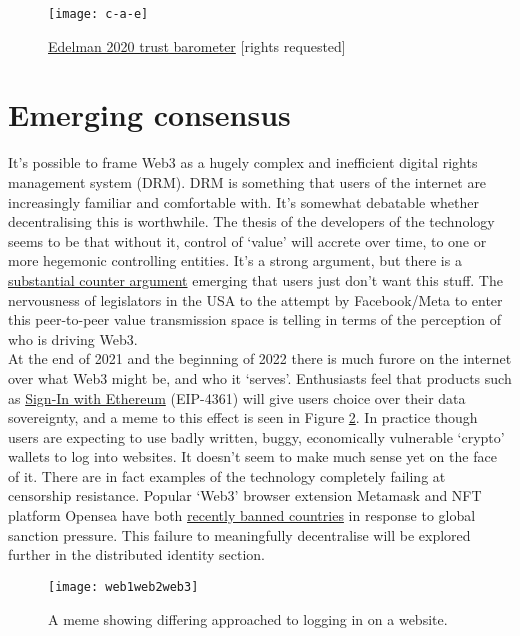 \begin{figure}
  \centering
    \texttt{[image: c-a-e]}
  \caption{\href{https://www.edelman.com/trust/2020-trust-barometer}{Edelman 2020 trust barometer} [rights requested]}
  \label{fig:trustbarometer}
\end{figure}
\section{Emerging consensus}
It's possible to frame Web3 as a hugely complex and inefficient digital rights management system (DRM). DRM is something that users of the internet are increasingly familiar and comfortable with. It's somewhat debatable whether decentralising this is worthwhile. The thesis of the developers of the technology seems to be that without it, control of `value' will accrete over time, to one or more hegemonic controlling entities. It's a strong argument, but there is a \href{https://moxie.org/2022/01/07/web3-first-impressions.html}{substantial counter argument} emerging that users just don't want this stuff. The nervousness of legislators in the USA to the attempt by Facebook/Meta to enter this peer-to-peer value transmission space is telling in terms of the perception of who is driving Web3.\\
At the end of 2021 and the beginning of 2022 there is much furore on the internet over what Web3 might be, and who it `serves'. 
Enthusiasts feel that products such as \href{https://blog.spruceid.com/sign-in-with-ethereum-is-a-game-changer-part-1/}{Sign-In with Ethereum} (EIP-4361) will give users choice over their data sovereignty, and a meme to this effect is seen in Figure \ref{fig:web1web2web3}. In practice though users are expecting to use badly written, buggy, economically vulnerable `crypto' wallets to log into websites. It doesn't seem to make much sense yet on the face of it. There are in fact examples of the technology completely failing at censorship resistance. Popular `Web3' browser extension Metamask and NFT platform Opensea have both \href{https://www.forbes.com/sites/stevenehrlich/2022/03/03/iranian-venezuela-users-abruptly-dropped-from-major-crypto-platforms-as-russian-sanctions-grow/?sh=22bcabc470b0}{recently banned countries} in response to global sanction pressure. This failure to meaningfully decentralise will be explored further in the distributed identity section. \\
\begin{figure}
  \centering
   \texttt{[image: web1web2web3]}
 \caption{A meme showing differing approached to logging in on a website.}
 \label{fig:web1web2web3}
\end{figure}
